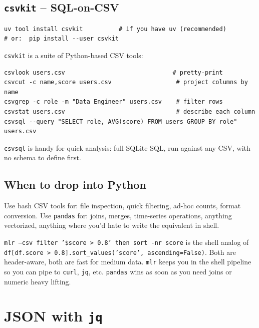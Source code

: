 \documentclass[11pt,a4paper]{article}
\newcommand{\pcmd}[1]{\texttt{\textcolor{pyKw}{#1}}}
\begin{document}
\subsection*{\texttt{csvkit} -- SQL-on-CSV}

\begin{lstlisting}[style=bashstyle]
uv tool install csvkit          # if you have uv (recommended)
# or:  pip install --user csvkit
\end{lstlisting}

\texttt{csvkit} is a suite of Python-based CSV tools:

\begin{lstlisting}[style=bashstyle]
csvlook users.csv                              # pretty-print
csvcut -c name,score users.csv                  # project columns by name
csvgrep -c role -m "Data Engineer" users.csv    # filter rows
csvstat users.csv                               # describe each column
csvsql --query "SELECT role, AVG(score) FROM users GROUP BY role" users.csv
\end{lstlisting}

\texttt{csvsql} is handy for quick analysis: full SQLite SQL, run
against any CSV, with no schema to define first.

\subsection*{When to drop into Python}

Use bash CSV tools for: file inspection, quick filtering, ad-hoc
counts, format conversion. Use \texttt{pandas} for: joins, merges,
time-series operations, anything vectorized, anything where you'd
hate to write the equivalent in shell.

\begin{comparepy}
\texttt{mlr --csv filter '\$score > 0.8' then sort -nr score} is the
shell analog of \pcmd{df[df.score > 0.8].sort\_values('score',
ascending=False)}. Both are header-aware, both are fast for medium
data. \texttt{mlr} keeps you in the shell pipeline so you can pipe
to \texttt{curl}, \texttt{jq}, etc. \texttt{pandas} wins as soon as
you need joins or numeric heavy lifting.
\end{comparepy}

\section{JSON with \texttt{jq}}
\label{sec:jq}
\end{document}
